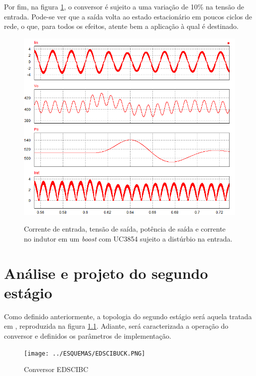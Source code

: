 \documentclass[
        12pt,
        openany, %
        oneside, %
        a4paper,			
        english,			
        brazil
        ]{abntbibufjf}
\begin{document}
Por fim, na figura \ref{pfc_pertub}, o conversor é sujeito a uma variação de 10\% na tensão de entrada. Pode-se ver que a saída volta ao estado estacionário em poucos ciclos de rede, o que, para todos os efeitos, atente bem a aplicação à qual é destinado.

\begin{figure}[!t]%
	\centering
	\caption{Corrente de entrada, tensão de saída, potência de saída e corrente no indutor em um \textit{boost} com UC3854 sujeito a distúrbio na entrada.}
	\includegraphics[scale=.6]{../GRAFICOS/pfc_pertub.PNG}\\
	\label{pfc_pertub}
\end{figure}

\chapter{Análise e projeto do segundo estágio}

Como definido anteriormente, a topologia do segundo estágio será aquela tratada em \cite{artigo_do_china}, reproduzida na figura \ref{china}. Adiante, será caracterizada a operação do conversor e definidos os parâmetros de implementação.

\begin{figure}[!h]
	\centering
	\caption{Conversor EDSCIBC}
	\texttt{[image: ../ESQUEMAS/EDSCIBUCK.PNG]}\\
	\label{china}
\end{figure}
\end{document}
